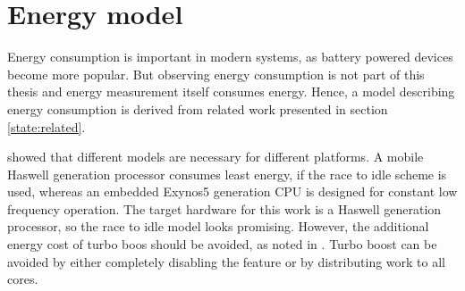 \section{Energy model}
\label{design:energy}

Energy consumption is important in modern systems, as battery powered devices
become more popular.
But observing energy consumption is not part of this thesis and energy
measurement itself consumes energy.
Hence, a model describing energy consumption is derived from related work
presented in section \ref{state:related}.

\cite{imes_poet_2015} showed that different models are necessary for different
platforms.
A mobile Haswell generation processor consumes least energy, if the race to
idle scheme is used, whereas an embedded Exynos5 generation CPU is designed for
constant low frequency operation.
The target hardware for this work is a Haswell generation processor, so the
race to idle model looks promising.
However, the additional energy cost of turbo boos should be avoided, as noted
in \cite{le_sueur_slow_2011}.
Turbo boost can be avoided by either completely disabling the feature or by
distributing work to all cores.

%

